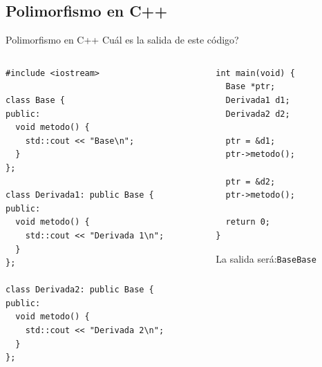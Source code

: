 \subsection{Polimorfismo en C++}
\begin{frame}{Polimorfismo en C++}{
\textquestiondown Cu\'al es la salida de este c\'odigo?
}
   \begin{columns}[t]
      \begin{column}{.6\linewidth}
         \begin{lstlisting}[style=normal,firstnumber=1]
#include <iostream>

class Base {
public:
  void metodo() {
    std::cout << "Base\n";
  }
};

class Derivada1: public Base {
public:
  void metodo() {
    std::cout << "Derivada 1\n";
  }
};

class Derivada2: public Base {
public:
  void metodo() {
    std::cout << "Derivada 2\n";
  }
};

         \end{lstlisting}
      \end{column}
      \begin{column}{.4\linewidth}
         \begin{lstlisting}[style=normal,firstnumber=25]
int main(void) {
  Base *ptr;
  Derivada1 d1;
  Derivada2 d2;

  ptr = &d1;
  ptr->metodo();

  ptr = &d2;
  ptr->metodo();

  return 0;
}
         \end{lstlisting}

      La salida ser\'a:\newline \texttt{Base\newline Base\newline}
      \end{column}
   \end{columns}
\end{frame}

